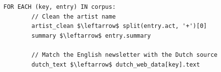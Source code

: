 \begin{lstlisting}[caption={Pseudocode for generating the cross-lingual evaluation corpus.}, label={lst:corpus_generation}, mathescape=true, frame=single, basicstyle=\ttfamily\small]
        FOR EACH (key, entry) IN corpus:    
        // Clean the artist name 
        artist_clean $\leftarrow$ split(entry.act, '+')[0] 
        summary $\leftarrow$ entry.summary
        
        // Match the English newsletter with the Dutch source
        dutch_text $\leftarrow$ dutch_web_data[key].text
\end{lstlisting}